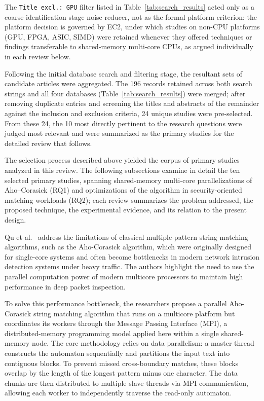 The \texttt{Title excl.: GPU} filter listed in Table~\ref{tab:search_results} acted only as a coarse identification-stage noise reducer, not as the formal platform criterion: the platform decision is governed by EC2, under which studies on non-CPU platforms (GPU, FPGA, ASIC, SIMD) were retained whenever they offered techniques or findings transferable to shared-memory multi-core CPUs, as argued individually in each review below.

Following the initial database search and filtering stage, the resultant sets of candidate articles were aggregated. The 196 records retained across both search strings and all four databases (Table~\ref{tab:search_results}) were merged; after removing duplicate entries and screening the titles and abstracts of the remainder against the inclusion and exclusion criteria, 24 unique studies were pre-selected. From these 24, the 10 most directly pertinent to the research questions were judged most relevant and were summarized as the primary studies for the detailed review that follows.


The selection process described above yielded the corpus of primary studies analyzed in this review. The following subsections examine in detail the ten selected primary studies, spanning shared-memory multi-core parallelizations of Aho--Corasick (RQ1) and optimizations of the algorithm in security-oriented matching workloads (RQ2); each review summarizes the problem addressed, the proposed technique, the experimental evidence, and its relation to the present design.


Qu et al.\ \cite{Qu2016MPI} address the limitations of classical multiple-pattern string matching algorithms, such as the Aho-Corasick algorithm, which were originally designed for single-core systems and often become bottlenecks in modern network intrusion detection systems under heavy traffic. The authors highlight the need to use the parallel computation power of modern multicore processors to maintain high performance in deep packet inspection.

To solve this performance bottleneck, the researchers propose a parallel Aho-Corasick string matching algorithm that runs on a multicore platform but coordinates its workers through the Message Passing Interface (MPI), a distributed-memory programming model applied here within a single shared-memory node. The core methodology relies on data parallelism: a master thread constructs the automaton sequentially and partitions the input text into contiguous blocks. To prevent missed cross-boundary matches, these blocks overlap by the length of the longest pattern minus one character. The data chunks are then distributed to multiple slave threads via MPI communication, allowing each worker to independently traverse the read-only automaton.

